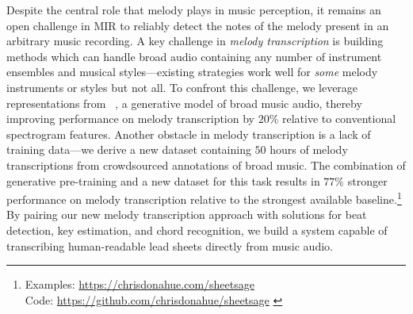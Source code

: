 Despite the central role that melody plays in music perception, 
it remains an open challenge in MIR to reliably detect the notes of the melody present in an arbitrary music recording. 
A key challenge in \emph{melody transcription} is building methods which can handle broad audio containing any number of instrument ensembles and musical styles---existing strategies work well for \emph{some} melody instruments or styles but not all. 
To confront this challenge, we leverage representations from \jukebox{}~\cite{dhariwal2020jukebox}, 
a generative model of broad music audio, 
thereby improving performance on melody transcription by 
$20$\% 
relative to conventional spectrogram features. 
Another obstacle in melody transcription is a lack of training data---we derive a new dataset containing $50$ hours of melody transcriptions from crowdsourced annotations of broad music. 
The combination of generative pre-training and a new dataset for this task results in 
$77\%$ stronger performance on melody transcription relative to the strongest available baseline.\footnote{Examples: \url{https://chrisdonahue.com/sheetsage} \\
Code: \url{https://github.com/chrisdonahue/sheetsage}
\label{sound_examples}} 
By pairing our new melody transcription approach with solutions for beat detection, key estimation, and chord recognition, 
we build a system capable of transcribing human-readable lead sheets directly from music audio.